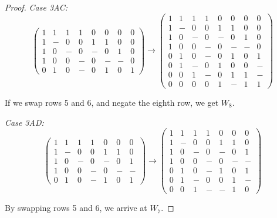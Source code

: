 \begin{lemma}
\begin{proof}
\emph{Case 3AC:}
 $$\left(\begin{array}{cccccccc}
     1 & 1 & 1 & 1 & 0 & 0 & 0 & 0\\
     1 & - & 0 & 0 & 1 & 1 & 0 & 0\\
     1 & 0 & - & 0 & - & 0 & 1 & 0\\
     1 & 0 & 0 & - & 0 & - & - & 0\\
     0 & 1 & 0 & - & 0 & 1 & 0 & 1
    \end{array}\right)
   \longrightarrow
    \left(\begin{array}{cccccccc}
     1 & 1 & 1 & 1 & 0 & 0 & 0 & 0\\
     1 & - & 0 & 0 & 1 & 1 & 0 & 0\\
     1 & 0 & - & 0 & - & 0 & 1 & 0\\
     1 & 0 & 0 & - & 0 & - & - & 0\\
     0 & 1 & 0 & - & 0 & 1 & 0 & 1\\
     0 & 1 & - & 0 & 1 & 0 & 0 & -\\
     0 & 0 & 1 & - & 0 & 1 & 1 & -\\
     0 & 0 & 0 & 0 & 1 & - & 1 & 1
    \end{array}\right)$$

If we swap rows 5 and 6, and negate the eighth row, we get $W_8$.

\emph{Case 3AD:} 
 $$\left(\begin{array}{ccccccc}
     1 & 1 & 1 & 1 & 0 & 0 & 0\\
     1 & - & 0 & 0 & 1 & 1 & 0\\
     1 & 0 & - & 0 & - & 0 & 1\\
     1 & 0 & 0 & - & 0 & - & -\\
     0 & 1 & 0 & - & 1 & 0 & 1
    \end{array}\right)
   \longrightarrow
    \left(\begin{array}{ccccccc}
     1 & 1 & 1 & 1 & 0 & 0 & 0\\
     1 & - & 0 & 0 & 1 & 1 & 0\\
     1 & 0 & - & 0 & - & 0 & 1\\
     1 & 0 & 0 & - & 0 & - & -\\
     0 & 1 & 0 & - & 1 & 0 & 1\\
     0 & 1 & - & 0 & 0 & 1 & -\\
     0 & 0 & 1 & - & - & 1 & 0
    \end{array}\right)$$

By swapping rows 5 and 6, we arrive at $W_7$.

\end{proof}

\end{lemma}

